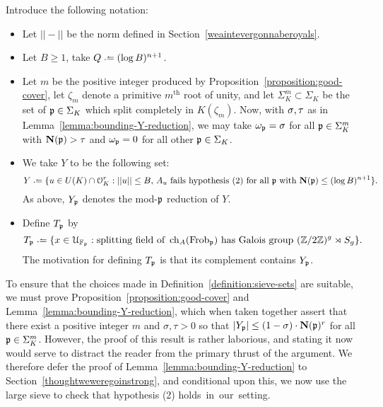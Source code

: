 \begin{definition}
	\label{definition:sieve-sets}
Introduce the following notation:
    \begin{itemize}[leftmargin=0.2in]
    \item Let $||-||$ be the norm defined in Section~\ref{weaintevergonnaberoyals}.
    \item Let $B \geq 1$, take $Q \defeq (\log B)^{n+1}$.
    \item Let $m$ be the positive integer produced by Proposition~\ref{proposition:good-cover}, let $\zeta_m$ denote a primitive $m^{\mathrm{th}}$ root of unity, and let $\Sigma^m_K \subset \Sigma_K$ be the set of ${\mathfrak{p}} \in \Sigma_K$ which split completely in $K(\zeta_m)$.
Now, with $\operatorname{\sigma}, \operatorname{\tau}$ as in Lemma~\ref{lemma:bounding-Y-reduction}, we may take $\omega_{\mathfrak{p}} = \operatorname{\sigma}$ for all $\mathfrak{p} \in \Sigma^m_K$ with $\mathbf{N}(\mathfrak{p}) > \operatorname{\tau}$ and $\omega_{\mathfrak{p}} = 0$ for all other ${\mathfrak{p}} \in \Sigma_K$.
    \item We take $Y$ to be the following set:
    $$Y \defeq \{u \in U(K) \cap \OO_K^r : ||u|| \le B,\, \text{$A_u$ fails hypothesis (2) for all $\mf{p}$ with $\N(\mf{p}) \le (\log B)^{n+1}$}\}.$$
	As above, $Y_\mathfrak p$ denotes the mod-$\mathfrak p$ reduction of $Y$.
\item Define $T_{\mathfrak p}$ by
	$$\goodGaloisSet_{\mf{p}} \defeq \{x \in \mc{U}_{\mathbb F_\pp} : \text{splitting field of }\charpoly_A(\frob_\pp) \text{ has Galois group } \gee \}.$$
    The motivation for defining $T_{\mathfrak{p}}$ is that its complement contains $Y_\mathfrak p$.
    \end{itemize}
\end{definition}

To ensure that the choices made in Definition~\ref{definition:sieve-sets} are suitable, we must prove Proposition~\ref{proposition:good-cover} and Lemma~\ref{lemma:bounding-Y-reduction}, which when taken together assert that there exist a positive integer $m$ and $\sigma, \tau> 0$ so that $|Y_\mathfrak p| \leq \left( 1-\operatorname{\sigma} \right) \cdot \mathbf{N} (\mathfrak p)^r$ for all $\mathfrak p \in \Sigma_K^m$. However, the proof of this result is rather laborious, and stating it now would serve to distract the reader from the primary thrust of the argument. We therefore defer the proof of Lemma~\ref{lemma:bounding-Y-reduction} to Section~\ref{thoughtweweregoinstrong}, and conditional upon this, we now use the large sieve to check that hypothesis (2) \mbox{holds in our setting.}

